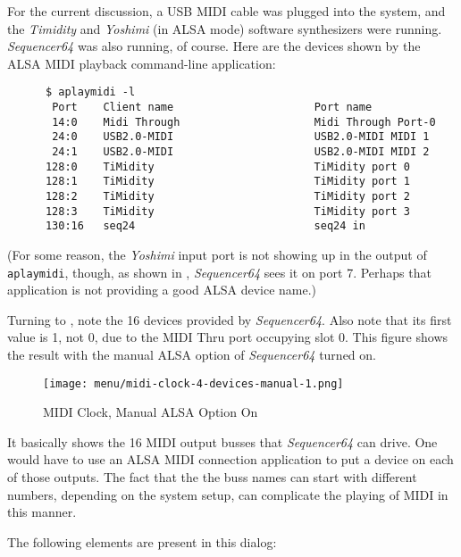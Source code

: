    For the current discussion, a USB MIDI cable was plugged into the system,
   and the \textsl{Timidity} and \textsl{Yoshimi} (in ALSA mode) software
   synthesizers were running.  \textsl{Sequencer64} was also running, of
   course.  Here are the devices shown by the ALSA MIDI playback
   command-line application:

   \begin{verbatim}
      $ aplaymidi -l
       Port    Client name                      Port name
       14:0    Midi Through                     Midi Through Port-0
       24:0    USB2.0-MIDI                      USB2.0-MIDI MIDI 1
       24:1    USB2.0-MIDI                      USB2.0-MIDI MIDI 2
      128:0    TiMidity                         TiMidity port 0
      128:1    TiMidity                         TiMidity port 1
      128:2    TiMidity                         TiMidity port 2
      128:3    TiMidity                         TiMidity port 3
      130:16   seq24                            seq24 in
   \end{verbatim}

   (For some reason, the \textsl{Yoshimi} input port is not showing up
   in the output of \texttt{aplaymidi}, though, as shown in
   ,
   \textsl{Sequencer64} sees it on port 7.  Perhaps that application is not
   providing a good ALSA device name.)
   
   Turning to ,
   note the 16 devices provided by
   \textsl{Sequencer64}.  Also note that its first value is 1, not 0, due to
   the MIDI Thru port occupying slot 0.
   This figure shows the result with the manual ALSA option of
   \textsl{Sequencer64} turned on.

\begin{figure}[H]
   \centering 
   \texttt{[image: menu/midi-clock-4-devices-manual-1.png]}
   \caption{MIDI Clock, Manual ALSA Option On}
   \label{fig:seq64_midi_clock_4_devices_manual_1}
\end{figure}

   It basically shows the 16 MIDI output busses that \textsl{Sequencer64} can
   drive.  One would have to use an ALSA MIDI connection application to put a
   device on each of those outputs.  The fact that the the buss names can
   start with different numbers, depending on the system setup, can complicate
   the playing of MIDI in this manner.

   The following elements are present in this dialog:

